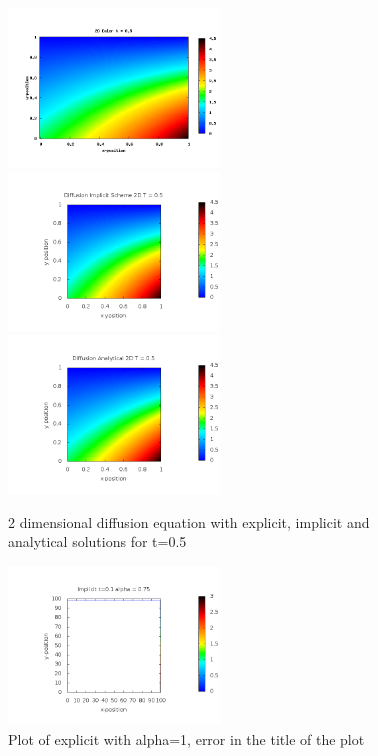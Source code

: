 \documentclass[a4wide,12pt]{article}
\begin{document}
 \begin{figure}[p]
 \includegraphics[width=0.5\textwidth]{euler2d05}
 \includegraphics[width=0.5\textwidth]{Implicit2DT0_5}
 \includegraphics[width=0.5\textwidth]{Analytical2DT0_5}
 \caption{2 dimensional diffusion equation with explicit, implicit and analytical solutions for t=0.5}
 \label{fig:10}
 \end{figure}
 
 \begin{figure}[p]
 \includegraphics[width=0.5\textwidth]{test3}
 \caption{Plot of explicit with alpha=1, error in the title of the plot}
 \label{fig:11}
 \end{figure}
 
\end{document}
